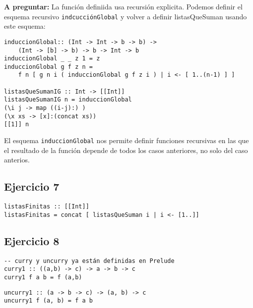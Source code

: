 \textbf{A preguntar:}
La función definiida usa recursión explicita. Podemos definir el esquema recursivo \texttt{indcucciónGlobal} y volver a definir listasQueSuman usando este esquema:

\begin{centrado}
\begin{verbatim}
induccionGlobal:: (Int -> Int -> b -> b) -> 
	(Int -> [b] -> b) -> b -> Int -> b
induccionGlobal _ _ z 1 = z
induccionGlobal g f z n = 
	f n [ g n i ( induccionGlobal g f z i ) | i <- [ 1..(n-1) ] ]

listasQueSumanIG :: Int -> [[Int]]
listasQueSumanIG n = induccionGlobal
(\i j -> map ((i-j):) )
(\x xs -> [x]:(concat xs)) 
[[1]] n
\end{verbatim}	
\end{centrado}

El esquema \texttt{induccionGlobal} nos permite definir funciones recursivas en las que el resultado de la función depende de todos los casos anteriores, no solo del caso anterios.

\subsection{Ejercicio 7}

\begin{centrado}
	\begin{verbatim}
listasFinitas :: [[Int]]
listasFinitas = concat [ listasQueSuman i | i <- [1..]]
\end{verbatim}
\end{centrado}	

\subsection{Ejercicio 8}
\begin{centrado}
	\begin{verbatim}
-- curry y uncurry ya están definidas en Prelude
curry1 :: ((a,b) -> c) -> a -> b -> c
curry1 f a b = f (a,b)
	\end{verbatim}
\end{centrado}

\begin{centrado}
\begin{verbatim}
uncurry1 :: (a -> b -> c) -> (a, b) -> c
uncurry1 f (a, b) = f a b
	\end{verbatim}
\end{centrado}

